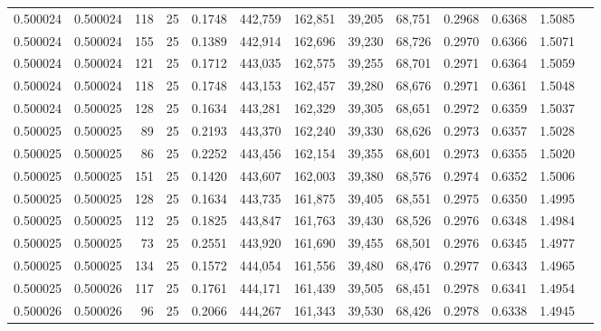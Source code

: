 \begin{tabular}{rrrrrrrrrrrrr}
0.500024 & 0.500024 &   118 &  25 &                                     0.1748 & 442,759 & 162,851 &  39,205 &  68,751 & 0.2968 & 0.6368 & 1.5085 \\
0.500024 & 0.500024 &   155 &  25 &                                     0.1389 & 442,914 & 162,696 &  39,230 &  68,726 & 0.2970 & 0.6366 & 1.5071 \\
0.500024 & 0.500024 &   121 &  25 &                                     0.1712 & 443,035 & 162,575 &  39,255 &  68,701 & 0.2971 & 0.6364 & 1.5059 \\
0.500024 & 0.500024 &   118 &  25 &                                     0.1748 & 443,153 & 162,457 &  39,280 &  68,676 & 0.2971 & 0.6361 & 1.5048 \\
0.500024 & 0.500025 &   128 &  25 &                                     0.1634 & 443,281 & 162,329 &  39,305 &  68,651 & 0.2972 & 0.6359 & 1.5037 \\
0.500025 & 0.500025 &    89 &  25 &                                     0.2193 & 443,370 & 162,240 &  39,330 &  68,626 & 0.2973 & 0.6357 & 1.5028 \\
0.500025 & 0.500025 &    86 &  25 &                                     0.2252 & 443,456 & 162,154 &  39,355 &  68,601 & 0.2973 & 0.6355 & 1.5020 \\
0.500025 & 0.500025 &   151 &  25 &                                     0.1420 & 443,607 & 162,003 &  39,380 &  68,576 & 0.2974 & 0.6352 & 1.5006 \\
0.500025 & 0.500025 &   128 &  25 &                                     0.1634 & 443,735 & 161,875 &  39,405 &  68,551 & 0.2975 & 0.6350 & 1.4995 \\
0.500025 & 0.500025 &   112 &  25 &                                     0.1825 & 443,847 & 161,763 &  39,430 &  68,526 & 0.2976 & 0.6348 & 1.4984 \\
0.500025 & 0.500025 &    73 &  25 &                                     0.2551 & 443,920 & 161,690 &  39,455 &  68,501 & 0.2976 & 0.6345 & 1.4977 \\
0.500025 & 0.500025 &   134 &  25 &                                     0.1572 & 444,054 & 161,556 &  39,480 &  68,476 & 0.2977 & 0.6343 & 1.4965 \\
0.500025 & 0.500026 &   117 &  25 &                                     0.1761 & 444,171 & 161,439 &  39,505 &  68,451 & 0.2978 & 0.6341 & 1.4954 \\
0.500026 & 0.500026 &    96 &  25 &                                     0.2066 & 444,267 & 161,343 &  39,530 &  68,426 & 0.2978 & 0.6338 & 1.4945 \\

\end{tabular}
